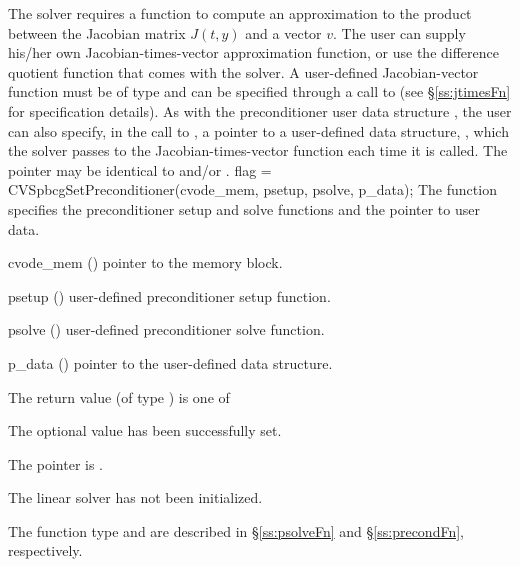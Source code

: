 The 
{\cvspbcg} solver requires a function to compute an approximation to the
product between the Jacobian matrix $J(t,y)$ and a vector $v$.
The user can supply his/her own Jacobian-times-vector approximation function, 
or use the difference quotient function  
that comes with the {\cvspbcg} solver.  A user-defined Jacobian-vector
function must be of type  and 
can be specified through a call to  
(see \S\ref{ss:jtimesFn} for specification details).
As with the preconditioner user data structure , the user can
also specify, in the call to , a pointer to a 
user-defined data structure, , which the {\cvspbcg} solver
passes to the Jacobian-times-vector function  each time it is called.
The pointer  may be identical to  and/or .
{
  flag = CVSpbcgSetPreconditioner(cvode\_mem, psetup, psolve, p\_data);
}
{
  The function  specifies the preconditioner
  setup and solve functions and the pointer to user data.
}
{
  \begin{args}
  \item[cvode\_mem] ()
    pointer to the {\cvodes} memory block.
  \item[psetup] ()
    user-defined preconditioner setup function.
  \item[psolve] ()
    user-defined preconditioner solve function.
  \item[p\_data] ()
     pointer to the user-defined data structure.
  \end{args}
}
{
  The return value  (of type ) is one of
  \begin{args}
  \item[\Id{CVSPBCG\_SUCCESS}] 
    The optional value has been successfully set.
  \item[\Id{CVSPBCG\_MEM\_NULL}]
    The  pointer is .
  \item[\Id{CVSPBCG\_LMEM\_NULL}]
    The {\cvspbcg} linear solver has not been initialized.
  \end{args}
}
{
   The function type  and  are
   described in \S\ref{ss:psolveFn} and \S\ref{ss:precondFn}, respectively.
}
